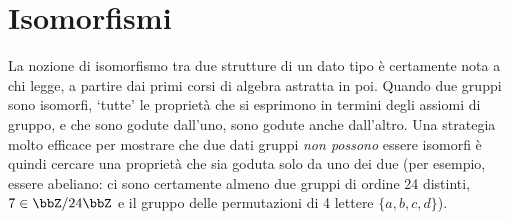 \section{Isomorfismi}\label{isomorfismi}
La nozione di isomorfismo tra due strutture di un dato tipo è certamente nota a chi legge, a partire dai primi corsi di algebra astratta in poi. Quando due gruppi sono isomorfi, `tutte' le proprietà che si esprimono in termini degli assiomi di gruppo, e che sono godute dall'uno, sono godute anche dall'altro. Una strategia molto efficace per mostrare che due dati gruppi \emph{non possono} essere isomorfi è quindi cercare una proprietà che sia goduta solo da uno dei due (per esempio, essere abeliano: ci sono certamente almeno due gruppi di ordine 24 distinti, $7\in\bbZ/24\bbZ$ e il gruppo delle permutazioni di 4 lettere $\{a,b,c,d\}$).

